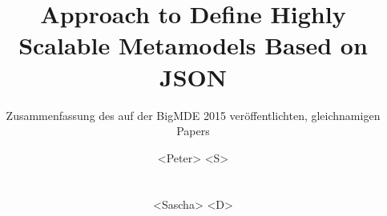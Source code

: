 \documentclass[ngerman]{ewks-latex}
\begin{document}
\title{Approach to Define Highly Scalable Metamodels Based on JSON}

\subtitle{Zusammenfassung des auf der BigMDE 2015 veröffentlichten, gleichnamigen Papers}

\author{
	\alignauthor
	<Peter> <S>\\
	\\
    \\
	\alignauthor
	<Sascha> <D>\\
	\\
    \\
}

\maketitle












\end{document}
